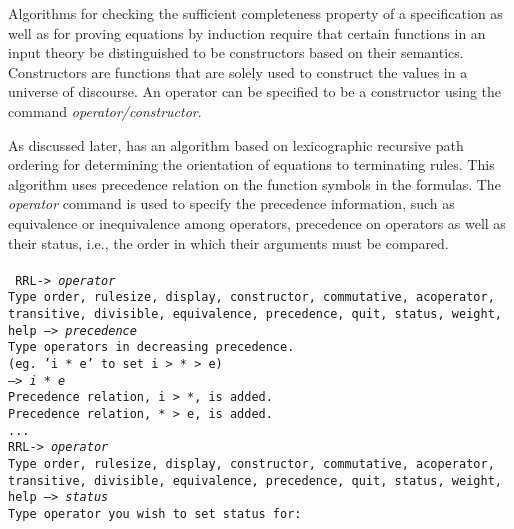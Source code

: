 Algorithms for checking the sufficient completeness property of a
specification as well as for proving equations by induction require that
certain functions in an input theory be distinguished to be
constructors based on their semantics. Constructors are functions that
are solely used to construct the values in a universe of discourse.
An operator can be specified to be a constructor using the command
{\em operator/constructor}.

As discussed later, \RRL has an algorithm based on lexicographic
recursive path ordering for determining the orientation of equations
to terminating rules. This algorithm uses precedence relation on the
function symbols in the formulas.  The {\em operator} command is used
to specify the precedence information, such as equivalence or
inequivalence among operators, precedence on operators as well as
their status, i.e., the order in which their arguments must be
compared. \\ \\
\tt
RRL-> {\em operator}\\
Type order, rulesize, display, constructor, commutative, acoperator, \\
\hspace*{0.4in}
     transitive, divisible, equivalence, precedence, quit, status, weight, \\
\hspace*{0.4in}
     help --> {\em precedence} \\
Type operators in decreasing precedence.\\
\hspace*{0.4in} (eg. 'i * e' to set i > * > e) \\
--> {\em i * e}\\
Precedence relation, i > *, is added.\\
Precedence relation, * > e, is added.\\
\hspace*{0.4in} ...\\
RRL-> {\em operator}\\
Type order, rulesize, display, constructor, commutative, acoperator, \\
\hspace*{0.4in}
     transitive, divisible, equivalence, precedence, quit, status, weight, \\
\hspace*{0.4in}
     help --> {\em status} \\
Type operator you wish to set status for: {\em *}\\
